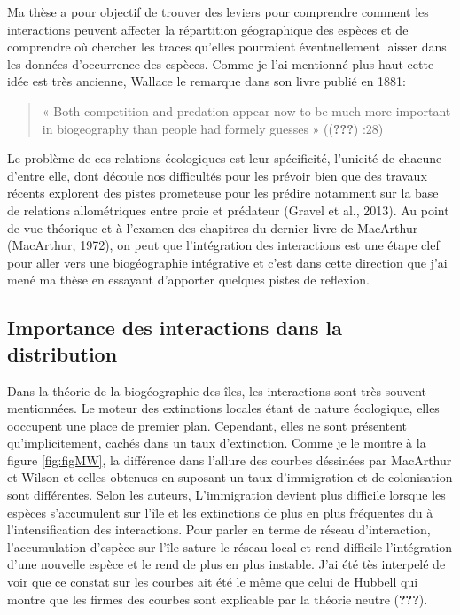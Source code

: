 Ma thèse a pour objectif de trouver des leviers pour comprendre comment
les interactions peuvent affecter la répartition géographique des
espèces et de comprendre où chercher les traces qu'elles pourraient
éventuellement laisser dans les données d'occurrence des espèces. Comme
je l'ai mentionné plus haut cette idée est très ancienne, Wallace le
remarque dans son livre publié en 1881:

\begin{quote}
« Both competition and predation appear now to be much more important in
biogeography than people had formely guesses » (({\textbf{???}}) :28)
\end{quote}

Le problème de ces relations écologiques est leur spécificité, l'unicité
de chacune d'entre elle, dont découle nos difficultés pour les prévoir
bien que des travaux récents explorent des pistes prometeuse pour les
prédire notamment sur la base de relations allométriques entre proie et
prédateur (Gravel et al., 2013). Au point de vue théorique et à l'examen
des chapitres du dernier livre de MacArthur (MacArthur, 1972), on peut
que l'intégration des interactions est une étape clef pour aller vers
une biogéographie intégrative et c'est dans cette direction que j'ai
mené ma thèse en essayant d'apporter quelques pistes de reflexion.

\subsection*{Importance des interactions dans la
distribution}\label{importance-des-interactions-dans-la-distribution}

Dans la théorie de la biogéographie des îles, les interactions sont très
souvent mentionnées. Le moteur des extinctions locales étant de nature
écologique, elles ooccupent une place de premier plan. Cependant, elles
ne sont présentent qu'implicitement, cachés dans un taux d'extinction.
Comme je le montre à la figure \ref{fig:figMW}, la différence dans
l'allure des courbes déssinées par MacArthur et Wilson et celles
obtenues en suposant un taux d'immigration et de colonisation sont
différentes. Selon les auteurs, L'immigration devient plus difficile
lorsque les espèces s'accumulent sur l'île et les extinctions de plus en
plus fréquentes du à l'intensification des interactions. Pour parler en
terme de réseau d'interaction, l'accumulation d'espèce sur l'île sature
le réseau local et rend difficile l'intégration d'une nouvelle espèce et
le rend de plus en plus instable. J'ai été tès interpelé de voir que ce
constat sur les courbes ait été le même que celui de Hubbell qui montre
que les firmes des courbes sont explicable par la théorie neutre
({\textbf{???}}).

